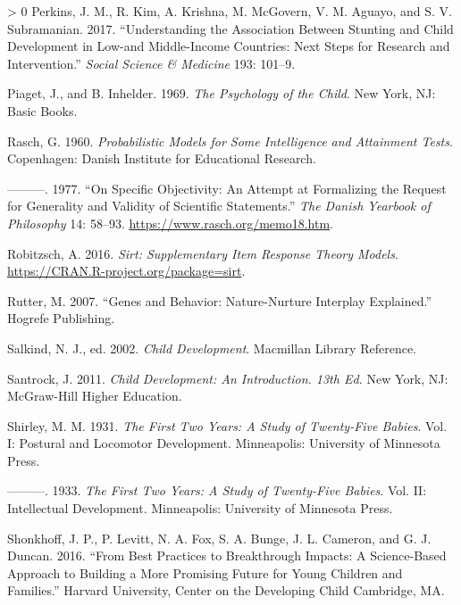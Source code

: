 \documentclass[
]{book}
\newlength{\cslhangindent}
\newenvironment{CSLReferences}[3] %
 {%
  \setlength{\parindent}{0pt}
  \ifodd #1 \everypar{\setlength{\hangindent}{\cslhangindent}}\ignorespaces\fi
  \ifnum #2 > 0
  \setlength{\parskip}{#2\baselineskip}
  \fi
 }%
 {}
\begin{document}
\begin{CSLReferences}{1}{0}
\leavevmode\hypertarget{ref-perkins2017understanding}{}%
Perkins, J. M., R. Kim, A. Krishna, M. McGovern, V. M. Aguayo, and S. V. Subramanian. 2017. {``Understanding the Association Between Stunting and Child Development in Low-and Middle-Income Countries: Next Steps for Research and Intervention.''} \emph{Social Science \& Medicine} 193: 101--9.

\leavevmode\hypertarget{ref-piaget1969}{}%
Piaget, J., and B. Inhelder. 1969. \emph{The Psychology of the Child}. New York, NJ: Basic Books.

\leavevmode\hypertarget{ref-rasch1960}{}%
Rasch, G. 1960. \emph{Probabilistic Models for Some Intelligence and Attainment Tests}. Copenhagen: Danish Institute for Educational Research.

\leavevmode\hypertarget{ref-rasch1977}{}%
---------. 1977. {``On Specific Objectivity: An Attempt at Formalizing the Request for Generality and Validity of Scientific Statements.''} \emph{The Danish Yearbook of Philosophy} 14: 58--93. \url{https://www.rasch.org/memo18.htm}.

\leavevmode\hypertarget{ref-robitzsch2016}{}%
Robitzsch, A. 2016. \emph{Sirt: Supplementary Item Response Theory Models}. \url{https://CRAN.R-project.org/package=sirt}.

\leavevmode\hypertarget{ref-rutter2007genes}{}%
Rutter, M. 2007. {``Genes and Behavior: Nature-Nurture Interplay Explained.''} Hogrefe Publishing.

\leavevmode\hypertarget{ref-salkind2002}{}%
Salkind, N. J., ed. 2002. \emph{Child Development}. Macmillan Library Reference.

\leavevmode\hypertarget{ref-santrock2010}{}%
Santrock, J. 2011. \emph{Child Development: An Introduction. 13th Ed.} New York, NJ: McGraw-Hill Higher Education.

\leavevmode\hypertarget{ref-shirley1931}{}%
Shirley, M. M. 1931. \emph{The First Two Years: A Study of Twenty-Five Babies}. Vol. I: Postural and Locomotor Development. Minneapolis: University of Minnesota Press.

\leavevmode\hypertarget{ref-shirley1933}{}%
---------. 1933. \emph{The First Two Years: A Study of Twenty-Five Babies}. Vol. II: Intellectual Development. Minneapolis: University of Minnesota Press.

\leavevmode\hypertarget{ref-skonkhoff2016best}{}%
Shonkhoff, J. P., P. Levitt, N. A. Fox, S. A. Bunge, J. L. Cameron, and G. J. Duncan. 2016. {``From Best Practices to Breakthrough Impacts: A Science-Based Approach to Building a More Promising Future for Young Children and Families.''} Harvard University, Center on the Developing Child Cambridge, MA.


\end{CSLReferences}
\end{document}
